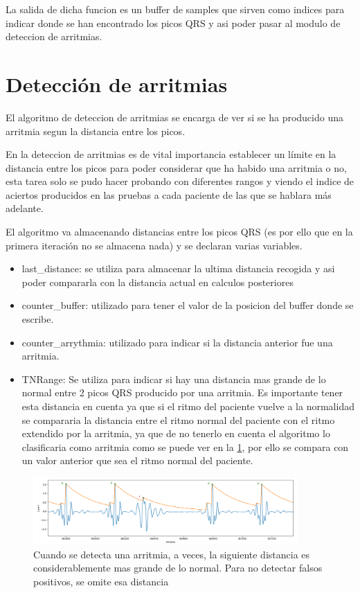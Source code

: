 La salida de dicha funcion es un buffer de samples que sirven como indices para indicar donde se han encontrado
los picos QRS y asi poder pasar al modulo de deteccion de arritmias.

\section{Detección de arritmias}

El algoritmo de deteccion de arritmias se encarga de ver si se ha producido una arritmia segun la
distancia entre los picos.

En la deteccion de arritmias es de vital importancia establecer un límite en la distancia entre los picos
para poder considerar que ha habido una arritmia o no, esta tarea solo se pudo hacer probando con diferentes
rangos y viendo el indice de aciertos producidos en las pruebas a cada paciente de las que se hablara más adelante. 

El algoritmo va almacenando distancias entre los picos QRS (es por ello que en la primera iteración no se almacena nada)
y se declaran varias variables.

\begin{itemize}
    \item last\_distance: se utiliza para almacenar la ultima distancia recogida y asi poder compararla con la distancia 
    actual en calculos posteriores
    \item counter\_buffer: utilizado para tener el valor de la posicion del buffer donde se escribe.
    \item counter\_arrythmia: utilizado para indicar si la distancia anterior fue una arritmia.
    \item TNRange: Se utiliza para indicar si hay una distancia mas grande de lo normal entre 2 picos QRS producido
    por una arritmia. Es importante tener esta distancia en cuenta ya que si el ritmo del paciente vuelve a la
    normalidad se compararia la distancia entre el ritmo normal del paciente con el ritmo extendido por la arritmia,
    ya que de no tenerlo en cuenta el algoritmo lo clasificaria como arritmia como se puede ver en la \cref{fig:senial_explicacion_TNRANGE}, por ello se compara con un valor anterior
    que sea el ritmo normal del paciente.
\end{itemize}

\begin{figure}[h!]
    \centering
    \includegraphics[width=0.9\textwidth]{./Images/img_algoritmo/senial_explicacion_TNRANGE.png}
    \caption{Cuando se detecta una arritmia, a veces, la siguiente distancia es considerablemente mas grande de lo normal. Para no detectar falsos positivos, se omite esa distancia}
    \label{fig:senial_explicacion_TNRANGE}
\end{figure}

